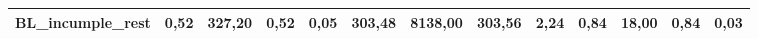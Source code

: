 \documentclass[12pt, spanish]{article}
\begin{document}
\begin{table}[H]
\begin{adjustwidth}{-1.9cm}{-1.9cm}
\begin{tabular}{|l|c|c|c|c|c|c|c|c|c|c|c|c|}
BL\_incumple\_rest                                      & 0,52                         & 327,20                         & 0,52                      & 0,05                   & 303,48                       & 8138,00                        & 303,56                    & 2,24                   & 0,84                         & 18,00                          & 0,84                      & 0,03               \\ \hline   
\end{tabular}

\end{adjustwidth}
\end{table}
\end{document}
